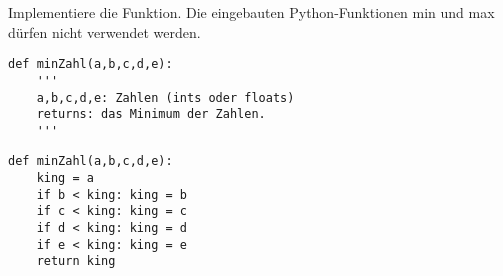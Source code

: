\question[3] Implementiere die Funktion. Die eingebauten Python-Funktionen min
und max dürfen nicht verwendet werden.

\begin{lstlisting}
def minZahl(a,b,c,d,e):
    '''
    a,b,c,d,e: Zahlen (ints oder floats)
    returns: das Minimum der Zahlen.
    '''
\end{lstlisting}
\begin{solutionbox}{8cm}
\begin{lstlisting}
def minZahl(a,b,c,d,e):
    king = a
    if b < king: king = b
    if c < king: king = c
    if d < king: king = d
    if e < king: king = e
    return king
\end{lstlisting}
\end{solutionbox}
